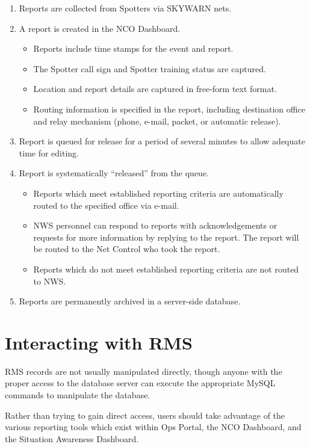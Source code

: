 \documentclass[pdflatex,letterpaper,twoside,12pt]{book}
\begin{document}
\begin{enumerate}
\item Reports are collected from Spotters via SKYWARN nets.
\item A report is created in the NCO Dashboard.
  \begin{itemize}
  \item Reports include time stamps for the event and report.
  \item The Spotter call sign and Spotter training status are captured.
  \item Location and report details are captured in free-form text format.
  \item Routing information is specified in the report, including destination office and relay mechanism (phone, e-mail, packet, or automatic release).
  \end{itemize}
\item Report is queued for release for a period of several minutes to allow adequate time for editing.
\item Report is systematically ``released'' from the queue.
  \begin{itemize}
  \item Reports which meet established reporting criteria are automatically routed to the specified office via e-mail.
  \item NWS personnel can respond to reports with acknowledgements or requests for more information by replying to the report.  The report will be routed to the Net Control who took the report.
  \item Reports which do not meet established reporting criteria are not routed to NWS.
  \end{itemize}
\item Reports are permanently archived in a server-side database.
\end{enumerate}


\section{Interacting with RMS}

RMS records are not usually manipulated directly, though anyone with the proper access to the database server can execute the appropriate MySQL commands to manipulate the database.

Rather than trying to gain direct access, users should take advantage of the various reporting tools which exist within Ops Portal, the NCO Dashboard, and the Situation Awareness Dashboard.
\end{document}
